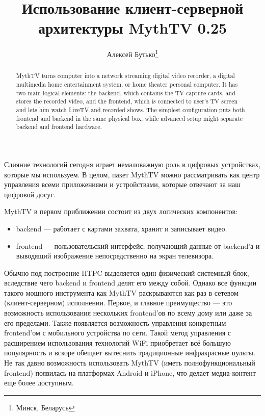 \documentclass[10pt, a5paper]{article}
\begin{document}
\title{Использование клиент-серверной архитектуры MythTV 0.25}%

\author{Алексей Бутько\footnote{Минск, Беларусь}}
\maketitle

\begin{abstract}
MythTV turns computer into a network streaming digital video recorder, a digital multimedia home entertainment system, or home theater personal computer. It has two main logical elements: the backend, which contains the TV capture cards, and stores the recorded video, and the frontend, which is connected to user's TV screen and lets him watch LiveTV and recorded shows. The simplest configuration puts both frontend and backend in the same physical box, while advanced setup might separate backend and frontend hardware.
\end{abstract}


Слияние технологий сегодня играет немаловажную роль в цифровых устройствах, которые мы используем. В целом, пакет MythTV можно рассматривать как центр управления всеми приложениями и устройствами, которые отвечают за наш цифровой досуг.

MythTV в первом приближении состоит из двух логических компонентов:

\begin{itemize}
  \item backend --- работает с картами захвата, хранит и записывает видео.
  \item frontend --- пользовательский интерфейс, получающий данные от backend'а и выводящий изображение непосредственно на экран телевизора.
\end{itemize}

Обычно под построение HTPC выделяется один физический системный блок, вследствие чего backend и frontend делят его между собой.  Однако все функции такого мощного инструмента как MythTV раскрываются как раз в сетевом (клиент-серверном) исполнении. Первое, и главное преимущество --- это возможность использования нескольких frontend'ов по всему дому или даже за его пределами. Также появляется возможность управления конкретным frontend'ом с мобильного устройства по сети. Такой метод управления с расширением использования технологий WiFi приобретает всё большую популярность и вскоре обещает вытеснить традиционные инфракрасные пульты. Не так давно возможность использовать MythTV (иметь полнофункциональный frontend)  появилась на платформах Android и iPhone, что делает медиа-контент еще более доступным.
\end{document}
